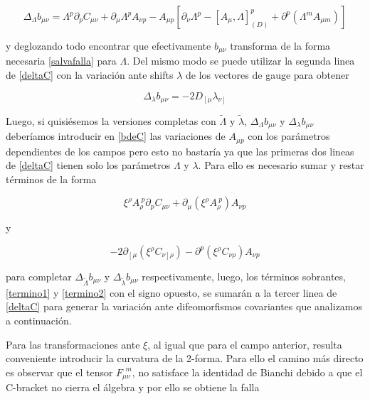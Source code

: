 \documentclass{article}
\numberwithin{equation}{section}
\begin{document}
\begin{equation}
\Delta_{\Lambda} b_{\mu \nu} = \Lambda^p \partial_p C_{\mu \nu} + \partial_{\mu} \Lambda^p A_{\nu p} - A_{\mu p } \left[ \partial_{\nu} \Lambda^p - \left[A_{\mu}, \Lambda \right]_{(D)}^p + \partial^p \left( \Lambda^m A_{\mu m} \right) \right]
\end{equation} 

y deglozando todo encontrar que efectivamente $ b_{\mu \nu} $ transforma de la forma necesaria \ref{salvafalla} para $ \Lambda $. Del mismo modo se puede utilizar la segunda linea de \ref{deltaC}
con la variación ante shifts $ \lambda $ de los vectores de gauge para obtener

\begin{equation}
\Delta_{\lambda} b_{\mu \nu } = - 2 D_{\left[\mu \right.} \lambda_{\left.\nu \right]} 
\end{equation}

Luego, si quisiésemos la versiones completas con $ \widetilde{\Lambda} $ y $ \widetilde{\lambda} $, $ \Delta_{\Lambda} b_{\mu \nu } $ y $ \Delta_{\lambda} b_{\mu \nu } $  deberíamos introducir en \ref{bdeC} las variaciones de $ A_{\mu p} $ con los parámetros dependientes de los campos pero esto no bastaría ya que las primeras dos lineas de \ref{deltaC} tienen solo los parámetros $ \Lambda $ y $ \lambda $. Para ello es necesario sumar y restar términos de la forma

\begin{equation}\label{termino1}
\xi^{\rho} A_{\rho}^{\ p} \partial_p C_{\mu \nu} + \partial_{\mu} \left(\xi^{\rho} A_{\rho}^{\ p} \right) A_{\nu p}
\end{equation}

y

\begin{equation}\label{termino2}
-2 \partial_{\left[\mu \right.} \left( \xi^{\rho} C_{\left. \nu \right] \rho} \right) - \partial^p \left(\xi^{\rho} C_{\nu \rho}\right) A_{\nu p}
\end{equation}

para completar $ \Delta_{\widetilde{\Lambda}}b_{\mu \nu} $ y $ \Delta_{\widetilde{\lambda}}b_{\mu \nu} $ respectivamente, luego, los términos sobrantes, \ref{termino1} y \ref{termino2} con el signo opuesto, se sumarán a la tercer linea de \ref{deltaC} para generar la variación ante difeomorfismos covariantes que analizamos a continuación.

Para las transformaciones ante $ \xi $, al igual que para el campo anterior, resulta conveniente introducir la curvatura de la 2-forma. Para ello el camino más directo es observar que el tensor $ F_{\mu \nu}^{\ \ m} $, no satisface la identidad de Bianchi debido a que el C-bracket no cierra el álgebra y por ello se obtiene la falla
\end{document}
